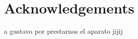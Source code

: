 \documentclass[a4paper,fleqn,usenatbib]{mnras}
\begin{document}






\section*{Acknowledgements}

a gustavo por prestarnos el aparato jijij






\bsp	%
\label{lastpage}
\end{document}
